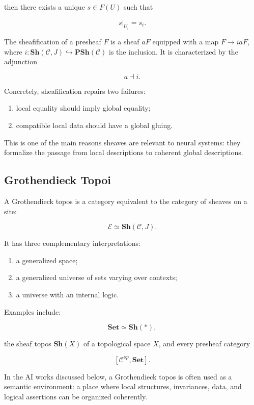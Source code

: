 \documentclass[11pt]{article}
\begin{document}
then there exists a unique \(s\in F(U)\) such that


\[
s|_{U_i}=s_i.
\]

The sheafification of a presheaf \(F\) is a sheaf \(aF\) equipped with a map \(F\to iaF\), where \(i:\mathbf{Sh}(\mathcal{C},J)\hookrightarrow \mathbf{PSh}(\mathcal{C})\) is the inclusion. It is characterized by the adjunction


\[
a\dashv i.
\]

Concretely, sheafification repairs two failures:


\begin{enumerate}
\item local equality should imply global equality;
\item compatible local data should have a global gluing.
\end{enumerate}

This is one of the main reasons sheaves are relevant to neural systems: they formalize the passage from local descriptions to coherent global descriptions.


\subsection{Grothendieck Topoi}

A Grothendieck topos is a category equivalent to the category of sheaves on a site:


\[
\mathcal{E}\simeq\mathbf{Sh}(\mathcal{C},J).
\]

It has three complementary interpretations:


\begin{enumerate}
\item a generalized space;
\item a generalized universe of sets varying over contexts;
\item a universe with an internal logic.
\end{enumerate}

Examples include:


\[
\mathbf{Set}\simeq\mathbf{Sh}(*),
\]

the sheaf topos \(\mathbf{Sh}(X)\) of a topological space \(X\), and every presheaf category


\[
[\mathcal{C}^{op},\mathbf{Set}].
\]

In the AI works discussed below, a Grothendieck topos is often used as a semantic environment: a place where local structures, invariances, data, and logical assertions can be organized coherently.
\end{document}
